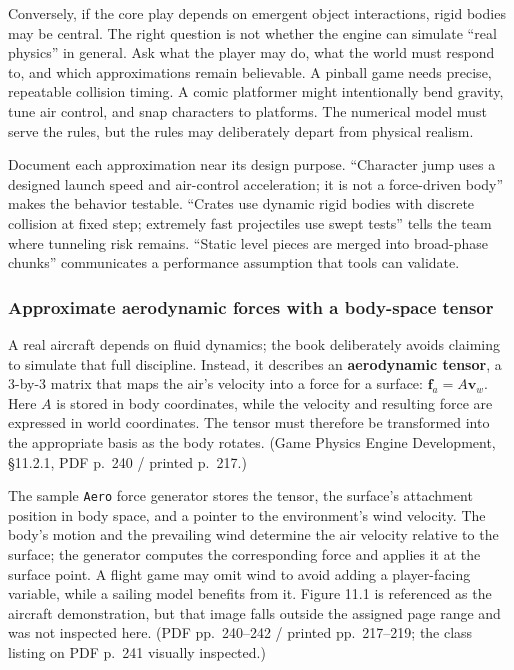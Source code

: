 Conversely, if the core play depends on emergent object interactions, rigid bodies may be central. The right question is not whether the engine can simulate ``real physics'' in general. Ask what the player may do, what the world must respond to, and which approximations remain believable. A pinball game needs precise, repeatable collision timing. A comic platformer might intentionally bend gravity, tune air control, and snap characters to platforms. The numerical model must serve the rules, but the rules may deliberately depart from physical realism.

Document each approximation near its design purpose. ``Character jump uses a designed launch speed and air-control acceleration; it is not a force-driven body'' makes the behavior testable. ``Crates use dynamic rigid bodies with discrete collision at fixed step; extremely fast projectiles use swept tests'' tells the team where tunneling risk remains. ``Static level pieces are merged into broad-phase chunks'' communicates a performance assumption that tools can validate.

\subsubsection{Approximate aerodynamic forces with a body-space tensor}\label{06-engine-ii-ch033-approximate-aerodynamic-forces-with-a-body-space-tensor}

A real aircraft depends on fluid dynamics; the book deliberately avoids claiming to simulate that full discipline. Instead, it describes an \textbf{aerodynamic tensor}, a 3-by-3 matrix that maps the air's velocity into a force for a surface: \(\mathbf{f}_a = A\mathbf{v}_w\). Here \(A\) is stored in body coordinates, while the velocity and resulting force are expressed in world coordinates. The tensor must therefore be transformed into the appropriate basis as the body rotates. (Game Physics Engine Development, §11.2.1, PDF p.~240 / printed p.~217.)

The sample \texttt{Aero} force generator stores the tensor, the surface's attachment position in body space, and a pointer to the environment's wind velocity. The body's motion and the prevailing wind determine the air velocity relative to the surface; the generator computes the corresponding force and applies it at the surface point. A flight game may omit wind to avoid adding a player-facing variable, while a sailing model benefits from it. Figure 11.1 is referenced as the aircraft demonstration, but that image falls outside the assigned page range and was not inspected here. (PDF pp.~240--242 / printed pp.~217--219; the class listing on PDF p.~241 visually inspected.)

